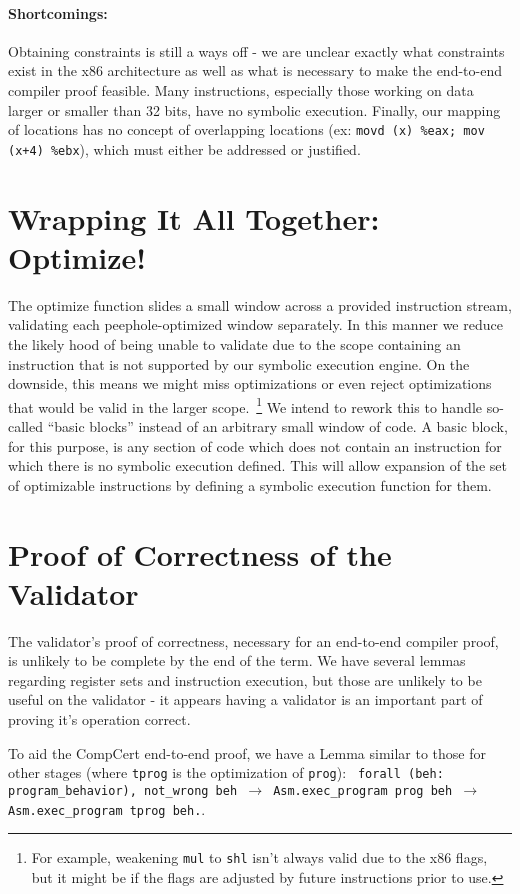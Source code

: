 \documentclass{article}
\begin{document}
\paragraph{Shortcomings: }
Obtaining constraints is still a ways off - we are unclear exactly
what constraints exist in the x86 architecture as well as what is
necessary to make the end-to-end compiler proof feasible.  Many
instructions, especially those working on data larger or smaller than
32 bits, have no symbolic execution.  Finally, our mapping of
locations has no concept of overlapping locations (ex: {\tt movd (x) \%eax;
mov (x+4) \%ebx}), which must either be addressed or justified.

\section{Wrapping It All Together: Optimize!}
The optimize function slides a small window across a provided
instruction stream, validating each peephole-optimized window
separately.  In this manner we reduce the likely hood of being unable
to validate due to the scope containing an instruction that is not
supported by our symbolic execution engine.  On the downside, this
means we might miss optimizations or even reject optimizations that
would be valid in the larger scope.~\footnote{For example, weakening
  {\tt mul} to {\tt shl} isn't always valid due to the x86 flags, but
  it might be if the flags are adjusted by future instructions prior
  to use.} We intend to rework this to handle so-called ``basic
blocks'' instead of an arbitrary small window of code. A basic block,
for this purpose, is any section of code which does not contain
an instruction for which there is no symbolic execution defined. This
will allow expansion of the set of optimizable instructions by
defining a symbolic execution function for them.

\section{Proof of Correctness of the Validator}
The validator's proof of correctness, necessary for an end-to-end
compiler proof, is unlikely to be complete by the end of the term.  We
have several lemmas regarding register sets and instruction execution,
but those are unlikely to be useful on the validator - it appears
having a validator is an important part of proving it's operation
correct.

To aid the CompCert end-to-end proof, we have a Lemma similar to those
for other stages (where {\tt tprog} is the optimization of {\tt prog}): {\tt
  forall (beh: program\_behavior), not\_wrong beh $\rightarrow$ Asm.exec\_program
  prog beh $\rightarrow$ Asm.exec\_program tprog beh.}.
\end{document}
